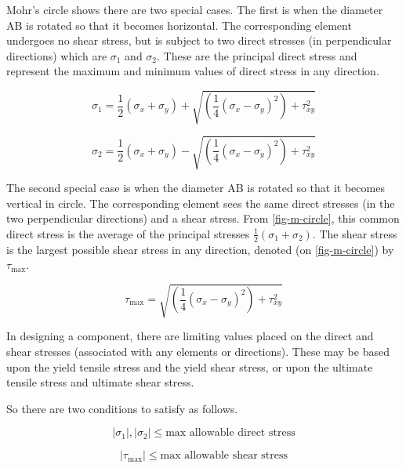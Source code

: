 Mohr's circle shows there are two special cases. The first is when the diameter AB is rotated so that it becomes horizontal. The corresponding element undergoes no shear stress, but is subject to two direct stresses (in perpendicular directions) which are \(\sigma_1\) and \(\sigma_2\). These are the principal direct stress and represent the maximum and minimum values of direct stress in any direction.

\begin{equation}
  \sigma_1 = \frac{1}{2}(\sigma_x+\sigma_y) + \sqrt{\left(\frac{1}{4}(\sigma_x-\sigma_y)^2\right)+\tau_{xy}^2}
\end{equation}

\begin{equation}
  \sigma_2 = \frac{1}{2}(\sigma_x+\sigma_y) - \sqrt{\left(\frac{1}{4}(\sigma_x-\sigma_y)^2\right)+\tau_{xy}^2}
\end{equation}

The second special case is when the diameter AB is rotated so that it becomes vertical in circle. The corresponding element sees the same direct stresses (in the two perpendicular directions) and a shear stress. From \cref{fig-m-circle}, this common direct stress is the average of the principal stresses \(\frac{1}{2}(\sigma_1+\sigma_2)\). The shear stress is the largest possible shear stress in any direction, denoted (on \cref{fig-m-circle}) by \(\tau_{\max}\).

\begin{equation}
  \tau_{\max} = \sqrt{\left(\frac{1}{4}(\sigma_x-\sigma_y)^2\right)+\tau_{xy}^2}
  \label{equ:tau-max}
\end{equation}

In designing a component, there are limiting values placed on the direct and shear stresses (associated with any elements or directions). These may be based upon the yield tensile stress and the yield shear stress, or upon the ultimate tensile stress and ultimate shear stress.

So there are two conditions to satisfy as follows.

\begin{equation}
|\sigma_1|,|\sigma_2| \leq \text{max\ allowable\ direct\ stress}
\end{equation}

\begin{equation}
|\tau_{\max}| \leq \text{max\ allowable\ shear\ stress}
\end{equation}


